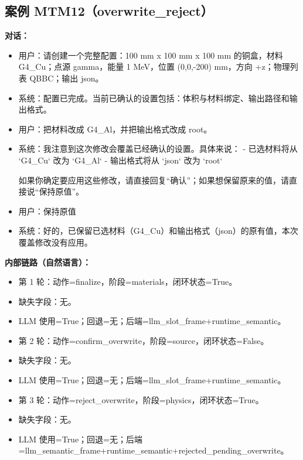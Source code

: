 \documentclass[11pt]{ctexart}
\begin{document}
\subsection{案例 MTM12（overwrite\_reject）}
\textbf{对话：}
\begin{itemize}
\item 用户：请创建一个完整配置：100 mm x 100 mm x 100 mm 的铜盒，材料 G4\_Cu；点源 gamma，能量 1 MeV，位置 (0,0,-200) mm，方向 +z；物理列表 QBBC；输出 json。
\item 系统：配置已完成。当前已确认的设置包括：体积与材料绑定、输出路径和输出格式。
\item 用户：把材料改成 G4\_Al，并把输出格式改成 root。
\item 系统：我注意到这次修改会覆盖已经确认的设置。具体来说：  
- 已选材料将从 `G4\_Cu` 改为 `G4\_Al`  
- 输出格式将从 `json` 改为 `root`  

如果你确定要应用这些修改，请直接回复“确认”；如果想保留原来的值，请直接说“保持原值”。
\item 用户：保持原值
\item 系统：好的，已保留已选材料（G4\_Cu）和输出格式（json）的原有值，本次覆盖修改没有应用。
\end{itemize}
\textbf{内部链路（自然语言）：}
\begin{itemize}
\item 第 1 轮：动作=finalize，阶段=materials，闭环状态=True。
\item 缺失字段：无。
\item LLM 使用=True；回退=无；后端=llm\_slot\_frame+runtime\_semantic。
\item 第 2 轮：动作=confirm\_overwrite，阶段=source，闭环状态=False。
\item 缺失字段：无。
\item LLM 使用=True；回退=无；后端=llm\_slot\_frame+runtime\_semantic。
\item 第 3 轮：动作=reject\_overwrite，阶段=physics，闭环状态=True。
\item 缺失字段：无。
\item LLM 使用=True；回退=无；后端=llm\_semantic\_frame+runtime\_semantic+rejected\_pending\_overwrite。
\end{itemize}
\end{document}
